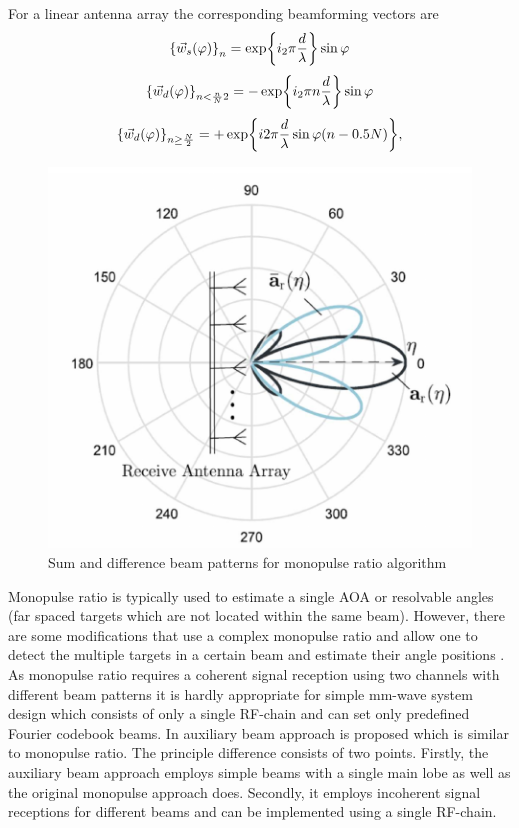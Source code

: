 For a linear antenna array the corresponding beamforming vectors are
\begin{equation}
    \label{eq:}
    \qty{\vec w_s (\varphi)}_n = \exp{i_2\pi \frac{d}{\lambda}} \sin \varphi
\end{equation}
\begin{equation}
    \label{eq:}
    \qty{\vec w_d (\varphi)}_{n < \frac n {N}{2}} = - \exp{i_2\pi n \frac{d}{\lambda}} \sin \varphi
\end{equation}
\begin{equation}
    \label{eq:}
    \qty{\vec w_d(\varphi)}_{n\geq \frac{N}{2}} = +\exp{i2\pi \frac{d}{\lambda}
    \sin \varphi(n - 0.5N)},
\end{equation}

\begin{figure}[htpb]
    \centering
    \includegraphics[width=0.6\linewidth]{figs/fig3.12}
    \caption{Sum and difference beam patterns for monopulse ratio algorithm
    \cite{Zhu2016}}
    \label{fig:}
\end{figure}

Monopulse ratio is typically used to estimate a single AOA or resolvable angles
(far spaced targets which are not located within the same beam). However, there
are some modifications that use a complex monopulse ratio and allow one to
detect the multiple targets in a certain beam and estimate their angle
positions \cite{Luoshengbin2016} \cite{Sherman2011}.  As monopulse ratio requires a coherent signal reception
using two channels with different beam patterns it is hardly appropriate for
simple mm-wave system design which consists of only a single RF-chain and can
set only predefined Fourier codebook beams. In \cite{Zhu2016} auxiliary beam approach is
proposed which is similar to monopulse ratio. The principle difference consists
of two points. Firstly, the auxiliary beam approach employs simple beams with a
single main lobe as well as the original monopulse approach does. Secondly, it
employs incoherent signal receptions for different beams and can be implemented
using a single RF-chain.

